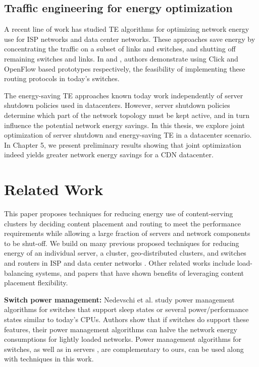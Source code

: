 \subsection{Traffic engineering for energy optimization}
\label{sec:teenergy}
A recent line of work has studied TE algorithms for optimizing network energy use for ISP networks and data center networks\cite{response, elasticTree, greenTE, Chiaraviglio, Andrews}. These approaches save energy by  concentrating the traffic on a subset of links and switches, and shutting off remaining switches and links. In \cite{response} and \cite{elasticTree}, authors demonstrate using Click and OpenFlow based prototypes respectively, the feasibility of implementing these routing protocols in today's switches. 

The energy-saving TE approaches known today work independently of server shutdown policies used in datacenters. 
However, server shutdown policies  determine which part of the network topology must be kept active, and in turn influence the potential network energy savings.
In this thesis, we explore joint optimization of server shutdown and energy-saving TE in a datacenter scenario. 
In Chapter 5, we present preliminary results showing that joint optimization indeed yields greater network energy savings for a CDN datacenter.


\section{Related Work}


This paper proposes techniques for reducing energy use of content-serving clusters by deciding content placement and routing to meet the performance requirements while allowing a large fraction of servers and network components to be shut-off. We build on many previous proposed techniques for reducing energy of  an individual server, a cluster, geo-distributed clusters, and  switches and routers in ISP and data center networks . Other related works include load-balancing systems, and papers that have shown benefits of leveraging content placement flexibility.  



\textbf{Switch power management:} Nedevschi et al. \cite{Nedevschi08} study power management algorithms for switches that support sleep states or several power/performance states similar to today's CPUs. Authors show that if switches do support these features, their power management algorithms can halve the network energy consumptions for lightly loaded networks. Power management algorithms for switches, as well as in servers \cite{serverpower}, are complementary to ours, can be used along with techniques in this work.


